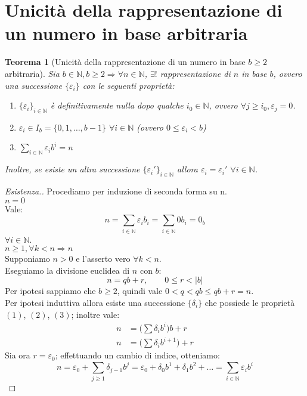 \documentclass[12pt,twoscolu]{article}
\newcommand{\N}{\mathbb{N}}
\newcommand{\implica}{\Longrightarrow}
\newcommand{\nin}{\forall n\in\N}
\newcommand{\eps}{\varepsilon}
\renewcommand\qedsymbol{$\blacksquare$}
\newcommand{\baseinduz}[1]{\\[1\baselineskip]{\boldmath$n = #1$}}
\newcommand{\induzdue}[1]{\\[1\baselineskip]{\boldmath$n \ge #1, \forall k < n \implica n$}}
\newtheorem{theorem}{Teorema}
\begin{document}
\section{Unicità della rappresentazione di un numero in base arbitraria}
\begin{theorem}[Unicità della rappresentazione di un numero in base $b \ge 2$ arbitraria]
Sia $b \in \N, b \ge 2 \implica \nin$, $\exists!$ rappresentazione di $n$ in base $b$, ovvero una successione $\{\eps_{i}\}$ con le seguenti proprietà:
\begin{enumerate}
\item $\{\eps_i\}_{i\in\N}$ è definitivamente nulla dopo qualche $i_{0}\in\N$, ovvero $\forall j \ge i_{0}, \eps_{j} = 0$.
\item $\eps_i \in I_b = \{0, 1,\ldots ,b-1\}$ $\forall i \in \N$ (ovvero $0 \le \eps_i < b$)
\item $\displaystyle\sum_{i\in\N} \eps_{i}b^i = n$
\end{enumerate}
Inoltre, se esiste un altra successione $\{\eps_i'\}_{i\in\N}$ allora $\eps_i = \eps_{i}'$ $\forall i \in \N$.
\end{theorem}

\renewcommand\qedsymbol{$\square$}
\begin{proof}[Esistenza.]
Procediamo per induzione di seconda forma su n.
\baseinduz{0}
\\Vale:
$$ n = \sum_{i\in\N} \eps_i b_i = \sum_{i\in\N} 0 b_i = 0_b$$
$\forall i \in\N$.
\induzdue{1}
\\Supponiamo $n > 0$ e l'asserto vero $\forall k < n$.
\\Eseguiamo la divisione euclidea di $n$ con $b$:
$$n = qb + r, \qquad0 \le r < |b|$$
Per ipotesi sappiamo che $b \ge 2$, quindi vale $ 0 < q < qb \le qb + r = n$.
\\Per ipotesi induttiva allora esiste una successione $\{\delta_i\}$ che possiede le proprietà $(1)$, $(2)$, $(3)$; inoltre vale:
\begin{align*}
n &= \Big(\sum \delta_i b^i\Big) b + r\\
n &= \Big(\sum \delta_i b^{i+1}\Big) + r
\end{align*}
Sia ora $r = \eps_0$; effettuando un cambio di indice, otteniamo:
$$ n = \eps_0 + \sum_{j \ge 1} \delta_{j-1}b^j = \eps_0 + \delta_0 b^1 + \delta_1 b^2 + \ldots = \sum_{i\in\N} \eps_i b^i $$
\end{proof}
\end{document}
